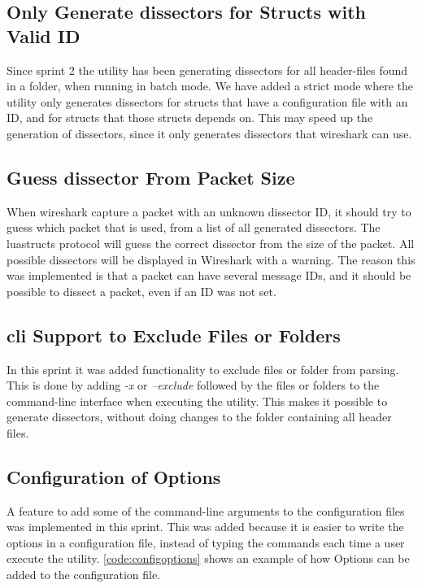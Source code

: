 \subsection{Only Generate \glspl{dissector} for Structs with Valid ID}
Since sprint 2 the \gls{utility} has been generating \glspl{dissector} for all \gls{header}-files 
found in a folder, when running in \gls{batch mode}. We have added a strict mode where the \gls{utility} 
only generates \glspl{dissector} for \glspl{struct} that have a configuration file with an 
ID, and for \glspl{struct} that those structs depends on. This may speed up the 
generation of \glspl{dissector}, since it only generates \glspl{dissector} that \Gls{wireshark} 
can use.

\subsection{Guess \gls{dissector} From Packet Size}
When \Gls{wireshark} capture a packet with an unknown dissector ID, it should try to 
guess which packet that is used, from a list of all generated dissectors. The 
luastructs protocol will guess the correct dissector from the size of the 
packet. All possible dissectors will be displayed in Wireshark with a warning. 
The reason this was implemented is that a packet can have several message IDs, 
and it should be possible to dissect a packet, even if an ID was not set.

\subsection{\gls{cli} Support to Exclude Files or Folders}
In this sprint it was added functionality to exclude files or folder from 
parsing. This is done by adding \emph{-x} or \emph{--exclude} followed by the 
files or folders to the command-line interface when executing the utility. 
This makes it possible to generate dissectors, without doing changes to the 
folder containing all header files.

\subsection{Configuration of Options}
A feature to add some of the command-line arguments to the configuration files 
was implemented in this sprint. This was added because it is easier to write 
the options in a configuration file, instead of typing the commands each time 
a user execute the utility. \autoref{code:configoptions} shows an example of 
how Options can be added to the configuration file.

